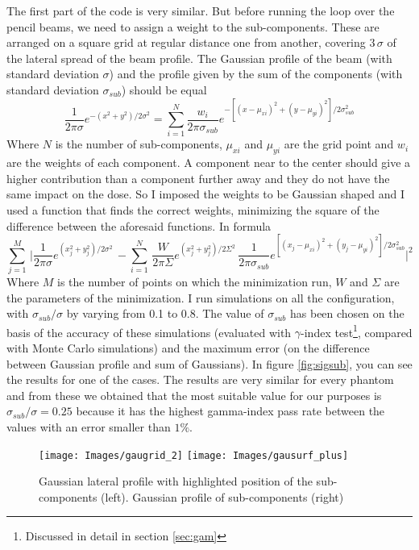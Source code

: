 \documentclass[12pt, a4paper, twoside]{book}
\begin{document}
The first part of the code is very similar. But before running the loop over the pencil beams, we need to assign a weight to the sub-components. These are arranged on a square grid at regular distance one from another, covering $3\,\sigma$ of the lateral spread of the beam profile. 
The Gaussian profile of the beam (with standard deviation $\sigma$) and the profile given by the sum of the components (with standard deviation $\sigma_{sub}$) should be equal
\[
\frac{1}{2 \pi\sigma}e^{-(x^2+y^2)/2\sigma^2} = \sum_{i=1}^N \frac{w_i}{2 \pi\sigma_{sub}}e^{-[(x-\mu_{xi})^2+(y-\mu_{yi})^2]/2\sigma_{sub}^2}
\]
Where $N$ is the number of sub-components, $\mu_{xi}$ and $\mu_{yi}$ are the grid point and $w_i$ are the weights of each component.
A component near to the center should give a higher contribution than a component further away and they do not have the same impact on the dose. So I imposed the weights to be Gaussian shaped and I used a function that finds the correct weights, minimizing the square of the difference between the aforesaid functions.
In formula
\[
\sum^M_{j=1}\, \bigg|\frac{1}{2\pi\sigma}e^{(x_j^2+y_j^2)/2\sigma^2}\, - \sum^N_{i=1} \,\frac{W}{2\pi\Sigma}e^{(x_j^2+y_j^2)/2\Sigma^2} \,\frac{1}{2\pi\sigma_{sub}}e^{[(x_j-\mu_{xi})^2+(y_j-\mu_{yi})^2]/2\sigma_{sub}^2} \bigg|^2
\]
Where $M$ is the number of points on which the minimization run, $W$ and $\Sigma$ are the parameters of the minimization.
I run simulations on all the configuration, with $\sigma_{sub}/\sigma$ by varying from 0.1 to 0.8. 
The value of $\sigma_{sub}$ has been chosen on the basis of the accuracy of these simulations (evaluated with $\gamma$-index test\footnote{Discussed in detail in section \ref{sec:gam}}, compared with Monte Carlo simulations) and the maximum error (on the difference between Gaussian profile and sum of Gaussians).
In figure \ref{fig:sigsub}, you can see the results for one of the cases. The results are very similar for every phantom and from these we obtained that the most suitable value for our purposes is $\sigma_{sub}/\sigma=0.25$ because it has the highest gamma-index pass rate between the values with an error smaller than $1\%$.
\begin{figure}[t]
{\texttt{[image: Images/gaugrid\_2]}}
{\texttt{[image: Images/gausurf\_plus]}}
\caption{Gaussian lateral profile with highlighted position of the sub-components (left). Gaussian profile of sub-components (right)}
\label{fig:gaugrid}
\end{figure}

\end{document}
